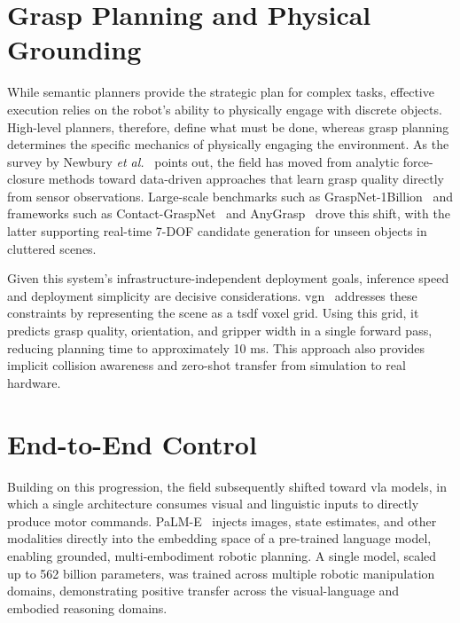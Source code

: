 \section{Grasp Planning and Physical Grounding}
While semantic planners provide the strategic plan for complex tasks, effective execution relies on the robot’s ability to physically engage with discrete objects. High-level planners, therefore, define what must be done, whereas grasp planning determines the specific mechanics of physically engaging the environment. As the survey by Newbury \emph{et al.}~\cite{newbury2023deeplearningapproachesgrasp} points out, the field has moved from analytic force-closure methods toward data-driven approaches that learn grasp quality directly from sensor observations. Large-scale benchmarks such as GraspNet-1Billion~\cite{graspnet} and frameworks such as Contact-GraspNet~\cite{sundermeyer2021contactgraspnetefficient6dofgrasp} and AnyGrasp~\cite{fang2023anygrasprobustefficientgrasp} drove this shift, with the latter supporting real-time 7-DOF candidate generation for unseen objects in cluttered scenes.

Given this system’s infrastructure-independent deployment goals, inference speed and deployment simplicity are decisive considerations. \gls{vgn}~\cite{breyer2021volumetricgraspingnetworkrealtime} addresses these constraints by representing the scene as a \gls{tsdf} voxel grid. Using this grid, it predicts grasp quality, orientation, and gripper width in a single forward pass, reducing planning time to approximately 10 ms. This approach also provides implicit collision awareness and zero-shot transfer from simulation to real hardware.

\section{End-to-End Control}
Building on this progression, the field subsequently shifted toward \gls{vla} models, in which a single architecture consumes visual and linguistic inputs to directly produce motor commands. PaLM-E~\cite{driess2023palmeembodiedmultimodallanguage} injects images, state estimates, and other modalities directly into the embedding space of a pre-trained language model, enabling grounded, multi-embodiment robotic planning. A single model, scaled up to 562 billion parameters, was trained across multiple robotic manipulation domains, demonstrating positive transfer across the visual-language and embodied reasoning domains.


